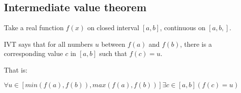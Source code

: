 
\subsection{Intermediate value theorem}

Take a real function \(f(x)\) on closed interval \([a,b]\), continuous on \([a,b,]\).

IVT says that for all numbers \(u\) between \(f(a)\) and \(f(b)\), there is a corresponding value \(c\) in \([a,b]\) such that \(f(c)=u\).

That is:

$\forall u \in [min(f(a),f(b)),max(f(a),f(b))] \exists c \in [a,b] (f(c)=u)$

